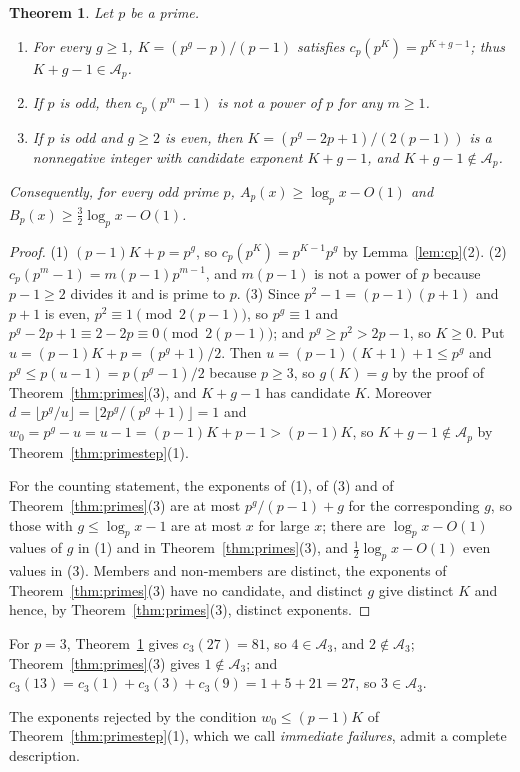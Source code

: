 \documentclass[11pt]{amsart}
\newtheorem{Theorem}{Theorem}[section]
\theoremstyle{definition}
\begin{document}
\begin{Theorem}
\label{thm:primefamilies}
Let $p$ be a prime.
\begin{enumerate}
\item For every $g\ge1$, $K=(p^g-p)/(p-1)$ satisfies $c_p(p^K)=p^{K+g-1}$; thus $K+g-1\in\mathcal{A}_p$.
\item If $p$ is odd, then $c_p(p^m-1)$ is not a power of $p$ for any $m\ge1$.
\item If $p$ is odd and $g\ge2$ is even, then $K=(p^g-2p+1)/(2(p-1))$ is a nonnegative integer with candidate exponent $K+g-1$, and $K+g-1\notin\mathcal{A}_p$.
\end{enumerate}
Consequently, for every odd prime $p$, $A_p(x)\ge\log_px-O(1)$ and $B_p(x)\ge\frac32\log_px-O(1)$.
\end{Theorem}
\begin{proof}
(1) $(p-1)K+p=p^g$, so $c_p(p^K)=p^{K-1}p^g$ by Lemma~\ref{lem:cp}(2). (2) $c_p(p^m-1)=m(p-1)p^{m-1}$, and $m(p-1)$ is not a power of $p$ because $p-1\ge2$ divides it and is prime to $p$. (3) Since $p^2-1=(p-1)(p+1)$ and $p+1$ is even, $p^2\equiv1\pmod{2(p-1)}$, so $p^g\equiv1$ and $p^g-2p+1\equiv2-2p\equiv0\pmod{2(p-1)}$; and $p^g\ge p^2>2p-1$, so $K\ge0$. Put $u=(p-1)K+p=(p^g+1)/2$. Then $u=(p-1)(K+1)+1\le p^g$ and $p^g\le p(u-1)=p(p^g-1)/2$ because $p\ge3$, so $g(K)=g$ by the proof of Theorem~\ref{thm:primes}(3), and $K+g-1$ has candidate $K$. Moreover $d=\lfloor p^g/u\rfloor=\lfloor2p^g/(p^g+1)\rfloor=1$ and $w_0=p^g-u=u-1=(p-1)K+p-1>(p-1)K$, so $K+g-1\notin\mathcal{A}_p$ by Theorem~\ref{thm:primestep}(1).

For the counting statement, the exponents of (1), of (3) and of Theorem~\ref{thm:primes}(3) are at most $p^{g}/(p-1)+g$ for the corresponding $g$, so those with $g\le\log_px-1$ are at most $x$ for large $x$; there are $\log_px-O(1)$ values of $g$ in (1) and in Theorem~\ref{thm:primes}(3), and $\frac12\log_px-O(1)$ even values in (3). Members and non-members are distinct, the exponents of Theorem~\ref{thm:primes}(3) have no candidate, and distinct $g$ give distinct $K$ and hence, by Theorem~\ref{thm:primes}(3), distinct exponents.
\end{proof}

For $p=3$, Theorem~\ref{thm:primefamilies} gives $c_3(27)=81$, so $4\in\mathcal{A}_3$, and $2\notin\mathcal{A}_3$; Theorem~\ref{thm:primes}(3) gives $1\notin\mathcal{A}_3$; and $c_3(13)=c_3(1)+c_3(3)+c_3(9)=1+5+21=27$, so $3\in\mathcal{A}_3$.

The exponents rejected by the condition $w_0\le(p-1)K$ of Theorem~\ref{thm:primestep}(1), which we call \emph{immediate failures}, admit a complete description.
\end{document}
